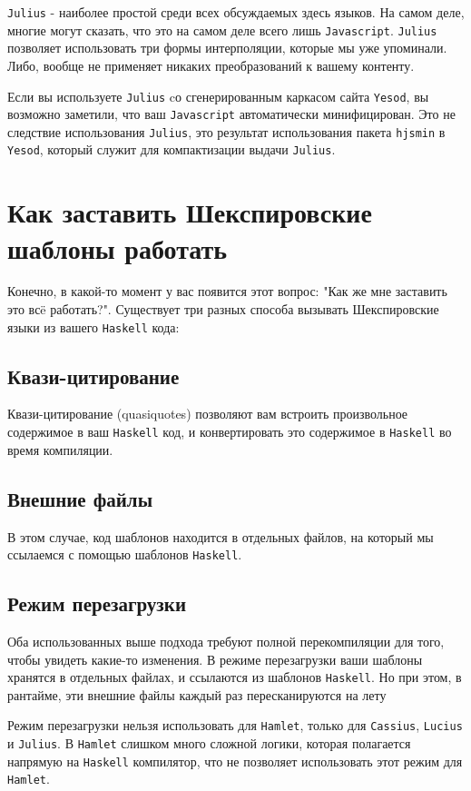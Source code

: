 \texttt{Julius} - наиболее простой среди всех обсуждаемых здесь языков. На самом деле, 
многие могут сказать, что это на самом деле всего лишь \texttt{Javascript}. \texttt{Julius}
позволяет использовать три формы интерполяции, которые мы уже упоминали.
Либо, вообще не применяет никаких преобразований к вашему контенту.

Если вы используете \texttt{Julius} cо сгенерированным каркасом сайта \texttt{Yesod}, вы возможно заметили, что ваш
\texttt{Javascript} автоматически минифицирован. Это не следствие использования \texttt{Julius}, это
результат использования пакета \lstinline!hjsmin! в \texttt{Yesod}, который служит для компактизации
выдачи \texttt{Julius}.

\section{Как заставить Шекспировские шаблоны работать}

Конечно, в какой-то момент у вас появится этот вопрос: "Как же мне заставить это
всë работать?". Существует три разных способа вызывать Шекспировские языки 
из вашего \texttt{Haskell} кода:

\subsection{Квази-цитирование}
Квази-цитирование (quasiquotes) позволяют вам встроить произвольное содержимое в ваш \texttt{Haskell} код, и
конвертировать это содержимое в \texttt{Haskell} во время компиляции.

\subsection {Внешние файлы}
В этом случае, код шаблонов находится в отдельных файлов, на который мы ссылаемся
с помощью шаблонов \texttt{Haskell}.

\subsection {Режим перезагрузки}
Оба использованных выше подхода требуют полной перекомпиляции для того, чтобы увидеть
какие-то изменения. В режиме перезагрузки ваши шаблоны хранятся в отдельных файлах,
и ссылаются из шаблонов \texttt{Haskell}. Но при этом, в рантайме, эти внешние файлы 
каждый раз пересканируются на лету

Режим перезагрузки нельзя использовать для \texttt{Hamlet}, только для \texttt{Cassius}, \texttt{Lucius} и \texttt{Julius}.
В \texttt{Hamlet} слишком много сложной логики, которая полагается напрямую на \texttt{Haskell}
компилятор, что не позволяет использовать этот режим для \texttt{Hamlet}.

